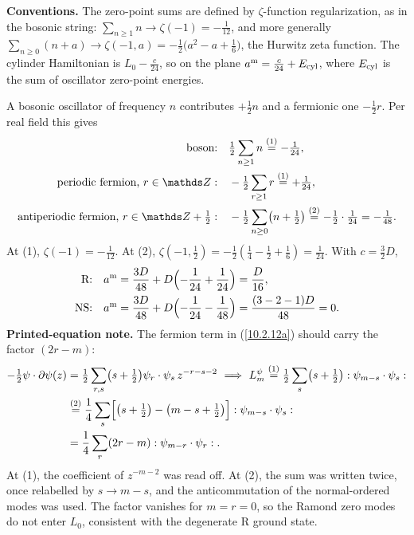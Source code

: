 	\begin{tcolorbox}[breakable]
		\begin{remark}
			\textbf{Conventions.} The zero-point sums are defined by $\zeta$-function regularization, as in the bosonic string: $\sum_{n\ge1}n\to\zeta(-1)=-\tfrac1{12}$, and more generally $\sum_{n\ge0}(n+a)\to\zeta(-1,a)=-\tfrac12\bigl(a^{2}-a+\tfrac16\bigr)$, the Hurwitz zeta function. The cylinder Hamiltonian is $L_0-\tfrac{c}{24}$, so on the plane $a^{\mathrm m}=\tfrac{c}{24}+E_{\rm cyl}$, where $E_{\rm cyl}$ is the sum of oscillator zero-point energies.

			A bosonic oscillator of frequency $n$ contributes $+\tfrac12n$ and a fermionic one $-\tfrac12r$. Per real field this gives
			\begin{align*}
				\text{boson:}&\quad \tfrac12\sum_{n\ge1}n\eqs{1}-\tfrac1{24},\\
				\text{periodic fermion, } r\in\mathds Z:&\quad -\tfrac12\sum_{r\ge1}r\eqs{1}+\tfrac1{24},\\
				\text{antiperiodic fermion, } r\in\mathds Z+\tfrac12:&\quad -\tfrac12\sum_{n\ge0}\bigl(n+\tfrac12\bigr)\eqs{2}-\tfrac12\cdot\tfrac1{24}=-\tfrac1{48}.
			\end{align*}
			At (1), $\zeta(-1)=-\tfrac1{12}$. At (2), $\zeta(-1,\tfrac12)=-\tfrac12(\tfrac14-\tfrac12+\tfrac16)=\tfrac1{24}$. With $c=\tfrac32D$,
			\begin{align*}
				\text{R:}\quad a^{\mathrm m}&=\frac{3D}{48}+D\Bigl(-\frac1{24}+\frac1{24}\Bigr)=\frac{D}{16},\\
				\text{NS:}\quad a^{\mathrm m}&=\frac{3D}{48}+D\Bigl(-\frac1{24}-\frac1{48}\Bigr)=\frac{(3-2-1)D}{48}=0 .
			\end{align*}
			\textbf{Printed-equation note.} The fermion term in (\ref{10.2.12a}) should carry the factor $(2r-m)$:
			\begin{align*}
				-\tfrac12\psi\cdot\partial\psi(z)&=\tfrac12\sum_{r,s}\bigl(s+\tfrac12\bigr)\psi_r\cdot\psi_s\,z^{-r-s-2}
				\ \Longrightarrow\ L_m^{\psi}\eqs{1}\tfrac12\sum_{s}\bigl(s+\tfrac12\bigr)\typecolon\psi_{m-s}\cdot\psi_{s}\typecolon\\
				&\eqs{2}\frac14\sum_{s}\Bigl[\bigl(s+\tfrac12\bigr)-\bigl(m-s+\tfrac12\bigr)\Bigr]\typecolon\psi_{m-s}\cdot\psi_{s}\typecolon\\
				&=\frac14\sum_{r}(2r-m)\typecolon\psi_{m-r}\cdot\psi_{r}\typecolon .
			\end{align*}
			At (1), the coefficient of $z^{-m-2}$ was read off. At (2), the sum was written twice, once relabelled by $s\to m-s$, and the anticommutation of the normal-ordered modes was used. The factor vanishes for $m=r=0$, so the Ramond zero modes do not enter $L_0$, consistent with the degenerate R ground state.
		\end{remark}
	\end{tcolorbox}
	
